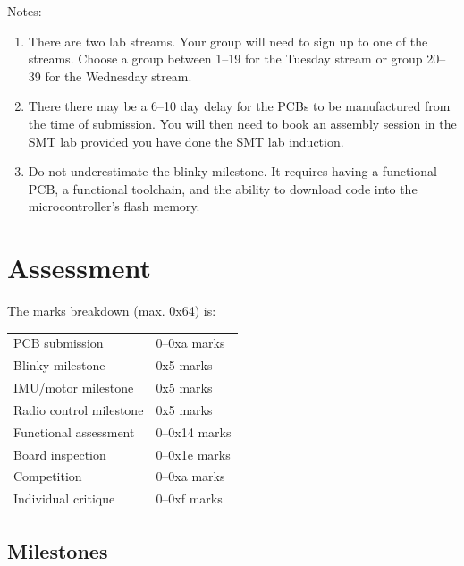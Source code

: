 \documentclass[11pt, a4paper]{article}
\begin{document}
Notes:
%
\begin{enumerate}
\item There are two lab streams.  Your group will need to sign up to
  one of the streams.  Choose a group between 1--19 for the Tuesday
  stream or group 20--39 for the Wednesday stream.

\item There there may be a 6--10 day delay for the PCBs to be
  manufactured from the time of submission.  You will then need to
  book an assembly session in the SMT lab provided you have done the
  SMT lab induction.

\item Do not underestimate the blinky milestone.  It requires having a
  functional PCB, a functional toolchain, and the ability to download
  code into the microcontroller's flash memory.

\end{enumerate}


\section{Assessment}

The marks breakdown (max. 0x64) is:
%
\begin{flushleft}
  \begin{tabular}{ll}
    PCB submission & 0--0xa marks\\
    Blinky milestone  & 0x5 marks\\
    IMU/motor milestone  & 0x5 marks\\
    Radio control milestone  & 0x5 marks\\
    Functional assessment & 0--0x14 marks \\
    Board inspection & 0--0x1e marks \\
    Competition & 0--0xa marks \\
    Individual critique & 0--0xf marks \\
  \end{tabular}

\end{flushleft}

\subsection{Milestones}
\end{document}

